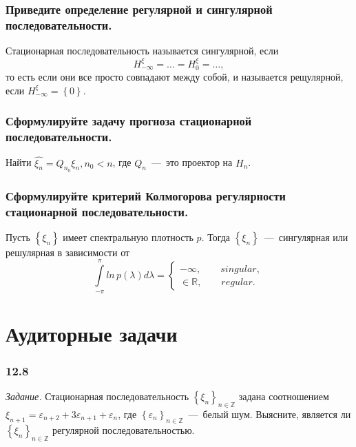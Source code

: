 \subsubsection*{Приведите определение регулярной и сингулярной последовательности.}

Стационарная последовательность называется сингулярной, если
\begin{equation*}
  H_{-\infty }^{ \xi } =
  \dotsc =
  H_0^{ \xi } =
  \dotsc,
\end{equation*}
то есть если они все просто совпадают между собой, и называется рещулярной,
если $H_{-\infty }^{ \xi } = \left\{ 0 \right\} $.

\subsubsection*{Сформулируйте задачу прогноза стационарной последовательности.}

Найти $ \hat{ \xi_n} = Q_{n_0} \xi_n, n_0 < n$, где $Q_n$~---~это проектор на $H_n$.

\subsubsection*{Сформулируйте критерий Колмогорова регулярности стационарной последовательности.}

Пусть $ \left\{ \xi_n \right\} $ имеет спектральную плотность $p$.
Тогда $ \left\{ \xi_n \right\} $~---~сингулярная или решулярная в зависимости от
\begin{equation*}
  \int \limits_{-\pi }^{ \pi } ln \, p \left( \lambda \right) d \lambda =
  \begin{cases}
    -\infty, \qquad singular, \\
    \in \mathbb{R}, \qquad regular.
  \end{cases}
\end{equation*}

\section*{Аудиторные задачи}

\subsubsection*{12.8}

\textit{Задание.}
Стационарная последовательность $ \left\{ \xi_n \right\}_{n \in \mathbb{Z}}$ задана соотношением
$ \xi_{n + 1} = \varepsilon_{n + 2} + 3 \varepsilon_{n + 1} + \varepsilon_n$,
где $ \left\{ \varepsilon_n \right\}_{n \in \mathbb{Z}}$~---~белый шум.
Выясните, является ли $ \left\{ \xi_n \right\}_{n \in \mathbb{Z}}$ регулярной последовательностью.


